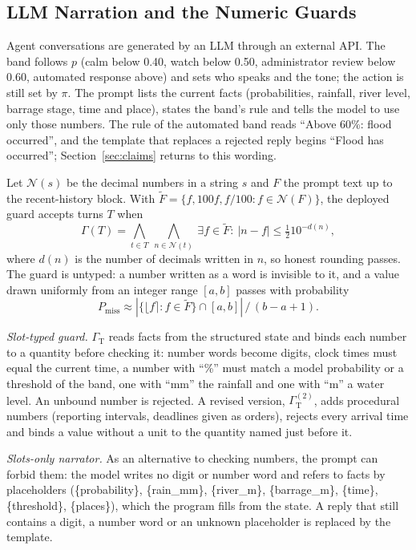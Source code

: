 \documentclass[conference]{IEEEtran}
\begin{document}
\subsection{LLM Narration and the Numeric Guards}
Agent conversations are generated by an LLM through an external API. The band follows $p$ (calm below 0.40, watch below 0.50, administrator review below 0.60, automated response above) and sets who speaks and the tone; the action is still set by $\pi$. The prompt lists the current facts (probabilities, rainfall, river level, barrage stage, time and place), states the band's rule and tells the model to use only those numbers. The rule of the automated band reads ``Above 60\%: flood occurred'', and the template that replaces a rejected reply begins ``Flood has occurred''; Section~\ref{sec:claims} returns to this wording.

Let $\mathcal{N}(s)$ be the decimal numbers in a string $s$ and $F$ the prompt text up to the recent-history block. With $\tilde F=\{f,100f,f/100: f\in\mathcal{N}(F)\}$, the deployed guard accepts turns $T$ when
\begin{equation}
\Gamma(T)=\bigwedge_{t\in T}\ \bigwedge_{n\in\mathcal{N}(t)}\ \exists f\in\tilde F:\ |n-f|\le \tfrac12 10^{-d(n)},
\label{eq:guard}
\end{equation}
where $d(n)$ is the number of decimals written in $n$, so honest rounding passes. The guard is untyped: a number written as a word is invisible to it, and a value drawn uniformly from an integer range $[a,b]$ passes with probability
\begin{equation}
P_{\mathrm{miss}}\approx |\{\lfloor f\rceil : f\in\tilde F\}\cap[a,b]|\,/\,(b-a+1).
\label{eq:miss}
\end{equation}

\textit{Slot-typed guard.} $\Gamma_{\mathrm{T}}$ reads facts from the structured state and binds each number to a quantity before checking it: number words become digits, clock times must equal the current time, a number with ``\%'' must match a model probability or a threshold of the band, one with ``mm'' the rainfall and one with ``m'' a water level. An unbound number is rejected. A revised version, $\Gamma_{\mathrm{T}}^{(2)}$, adds procedural numbers (reporting intervals, deadlines given as orders), rejects every arrival time and binds a value without a unit to the quantity named just before it.

\textit{Slots-only narrator.} As an alternative to checking numbers, the prompt can forbid them: the model writes no digit or number word and refers to facts by placeholders (\{probability\}, \{rain\_mm\}, \{river\_m\}, \{barrage\_m\}, \{time\}, \{threshold\}, \{places\}), which the program fills from the state. A reply that still contains a digit, a number word or an unknown placeholder is replaced by the template.
\end{document}
